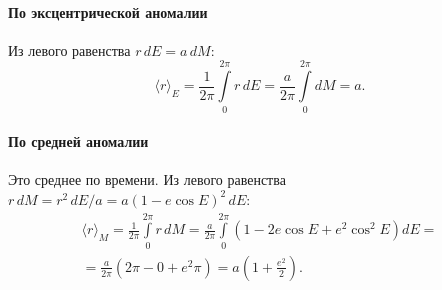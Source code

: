 \paragraph{По эксцентрической аномалии} Из левого равенства $r\,dE = a\,dM$:
\begin{equation*}
    \langle r \rangle_E
    = \frac{1}{2\pi}\int\limits_0^{2\pi} r\,dE
    = \frac{a}{2\pi}\int\limits_0^{2\pi} dM
    = a.
\end{equation*}

\paragraph{По средней аномалии} Это среднее по времени. Из левого равенства $r\,dM = r^2\,dE / a = a (1 - e\cos E)^2\,dE$:
\begin{multline*}
    \langle r \rangle_M
    = \frac{1}{2\pi}\int\limits_0^{2\pi} r\,dM
    = \frac{a}{2\pi}\int\limits_0^{2\pi} \left(1 - 2e\cos E + e^2\cos^2 E\right) dE = \\
    = \frac{a}{2\pi}\left(2\pi - 0 + e^2 \pi\right)
    = a\left(1 + \frac{e^2}{2}\right).
\end{multline*}

